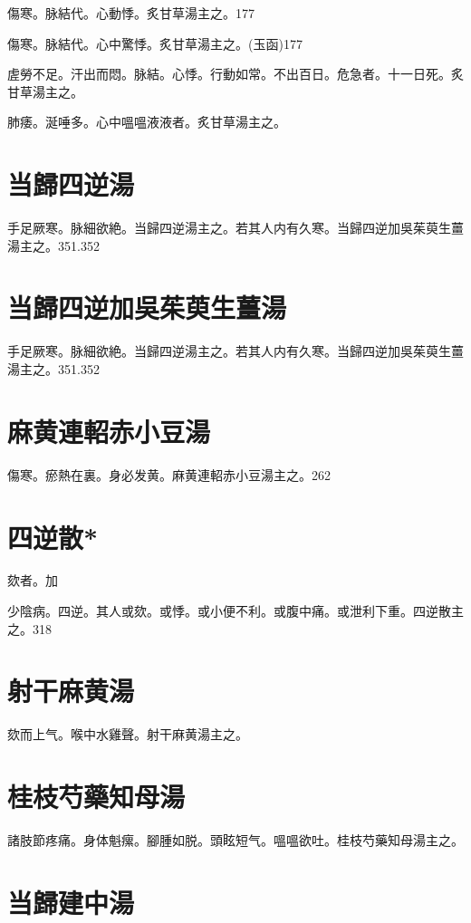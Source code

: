 \documentclass[12pt,twoside,UTF8,b5paper]{ctexbook}
\begin{document}
傷寒。脉結代。心動悸。炙甘草湯主之。177

傷寒。脉結代。心中驚悸。炙甘草湯主之。(玉函)177

虗勞不足。汗出而悶。脉結。心悸。行動如常。不出百日。危急者。十一日死。炙甘草湯主之。

肺痿。涎唾多。心中嗢嗢液液者。炙甘草湯主之。

\section{当歸四逆湯}

手足厥寒。脉細欲絶。当歸四逆湯主之。若其人内有久寒。当歸四逆加吳茱萸生薑湯主之。351.352

\section{当歸四逆加吳茱萸生薑湯}

手足厥寒。脉細欲絶。当歸四逆湯主之。若其人内有久寒。当歸四逆加吳茱萸生薑湯主之。351.352

\section{麻黄連軺赤小豆湯}

傷寒。瘀熱在裏。身必发黄。麻黄連軺赤小豆湯主之。262

\section{四逆散*}

欬者。加

少陰病。四逆。其人或欬。或悸。或小便不利。或腹中痛。或泄利下重。四逆散主之。318

\section{射干麻黄湯}

欬而上气。喉中水雞聲。射干麻黄湯主之。

\section{桂枝芍藥知母湯}

諸肢節疼痛。身体魁瘰。腳腫如脱。頭眩短气。嗢嗢欲吐。桂枝芍藥知母湯主之。

\section{当歸建中湯}
\end{document}
